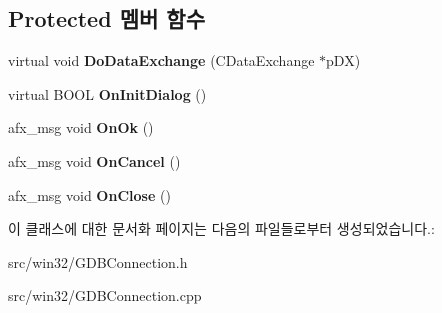 \subsection*{Protected 멤버 함수}
\begin{DoxyCompactItemize}
\item 
\mbox{\label{class_g_d_b_port_dlg_a05547373a733d6038a8b1091e3f94d71}} 
virtual void {\bfseries Do\+Data\+Exchange} (C\+Data\+Exchange $\ast$p\+DX)
\item 
\mbox{\label{class_g_d_b_port_dlg_af7abe221ad56b1aedf9f3dad6e03a031}} 
virtual B\+O\+OL {\bfseries On\+Init\+Dialog} ()
\item 
\mbox{\label{class_g_d_b_port_dlg_a1f6d1611b04e5e1803b4d2faf1a117f2}} 
afx\+\_\+msg void {\bfseries On\+Ok} ()
\item 
\mbox{\label{class_g_d_b_port_dlg_aec825d9c81585a57a4951fe68940293d}} 
afx\+\_\+msg void {\bfseries On\+Cancel} ()
\item 
\mbox{\label{class_g_d_b_port_dlg_a77f1b200ffbe8a3d0cc555baec9c36ce}} 
afx\+\_\+msg void {\bfseries On\+Close} ()
\end{DoxyCompactItemize}


이 클래스에 대한 문서화 페이지는 다음의 파일들로부터 생성되었습니다.\+:\begin{DoxyCompactItemize}
\item 
src/win32/G\+D\+B\+Connection.\+h\item 
src/win32/G\+D\+B\+Connection.\+cpp\end{DoxyCompactItemize}
